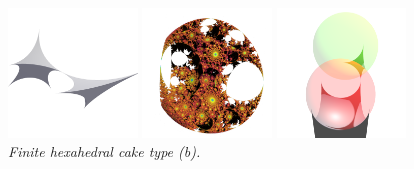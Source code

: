 \documentclass[suppldata, dvipdfmx]{interact}
\theoremstyle{plain}%
\theoremstyle{definition}
\theoremstyle{remark}
\theoremstyle{problemstyle}
\begin{document}
\begin{figure}[H]
 \begin{minipage}{0.5\textwidth}
  \begin{minipage}[t]{0.24\textwidth}
   \centering \includegraphics[width=1.35in, height=1.35in,
   keepaspectratio]{./img/sphairahedron/hexahedralCake3/sphairahedronFinite_b.png}
  \end{minipage}
  \hspace*{\fill}
  \begin{minipage}[t]{0.24\textwidth}
   \centering
   \includegraphics[width=1.35in, height=1.35in,
   keepaspectratio]{./img/sphairahedron/hexahedralCake3/limitsetFinite_b.png}
  \end{minipage}
  \hspace*{\fill}
  \caption{\textit{Finite hexahedral cake type (b).}}
  \label{}
 \end{minipage}
 \hspace*{\fill}
 \begin{minipage}{0.5\textwidth}
  \begin{minipage}[t]{0.24\textwidth}
   \centering
   \includegraphics[width=1.35in, height=1.35in,
   keepaspectratio]{./img/sphairahedron/hexahedralCake3/sphairahedralPrismInf_b.png}
  \end{minipage}
  \hspace*{\fill}

\end{minipage}
\end{figure}
\end{document}
